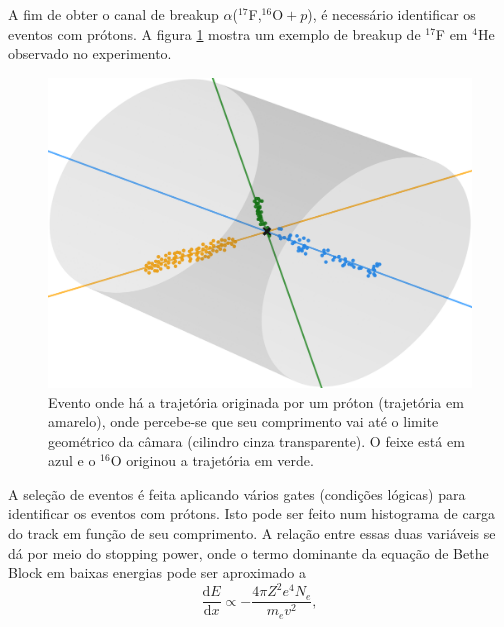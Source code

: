 \documentclass[a4paper,12pt,oneside]{book}
\begin{document}

\par A fim de obter o canal de breakup $\alpha$($^{17}$F,$^{16}\mathrm{O}+p$), é necessário identificar os eventos com prótons. A figura \ref{fig:exemplo_proton_16O} mostra um exemplo de breakup de $^{17}$F em $^4$He observado no experimento.

\begin{figure}[H]
    \centering
    \includegraphics[scale = 1., width=0.75\columnwidth]{figs/evento_ex_run_261_evento_5853.png}
    \caption{Evento onde há a trajetória originada por um próton (trajetória em amarelo), onde percebe-se que seu comprimento vai até o limite geométrico da câmara (cilindro cinza transparente). O feixe está em azul e o $^{16}$O originou a trajetória em verde.}
    \label{fig:exemplo_proton_16O}
\end{figure}

\par A seleção de eventos é feita aplicando vários gates (condições lógicas) para identificar os eventos com prótons. Isto pode ser feito num histograma de carga do track em função de seu comprimento. A relação entre essas duas variáveis se dá por meio do stopping power, onde o termo dominante da equação de Bethe Block \cite{leo1988techniques} em baixas energias pode ser aproximado a
\begin{equation}\label{eq:bethe_block_low_energies_1}
	\frac{\mathrm{d}E}{\mathrm{d}x} \propto -\frac{4\pi Z^2  e^4 N_e}{m_ev^2},
\end{equation}
\end{document}
